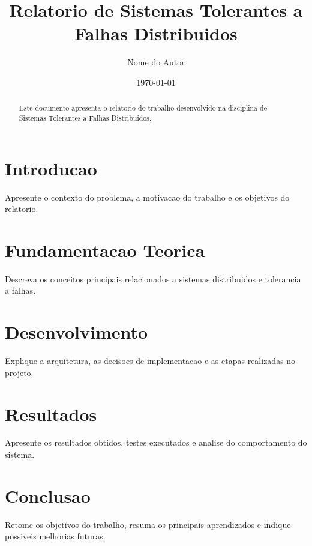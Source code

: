 \documentclass[12pt,a4paper]{article}
\title{Relatorio de Sistemas Tolerantes a Falhas Distribuidos}
\author{Nome do Autor}
\date{\today}
\begin{document}
\maketitle

\begin{abstract}
Este documento apresenta o relatorio do trabalho desenvolvido na disciplina de
Sistemas Tolerantes a Falhas Distribuidos.
\end{abstract}

\section{Introducao}

Apresente o contexto do problema, a motivacao do trabalho e os objetivos do
relatorio.

\section{Fundamentacao Teorica}

Descreva os conceitos principais relacionados a sistemas distribuidos e
tolerancia a falhas.

\section{Desenvolvimento}

Explique a arquitetura, as decisoes de implementacao e as etapas realizadas no
projeto.

\section{Resultados}

Apresente os resultados obtidos, testes executados e analise do comportamento do
sistema.

\section{Conclusao}

Retome os objetivos do trabalho, resuma os principais aprendizados e indique
possiveis melhorias futuras.



\end{document}
